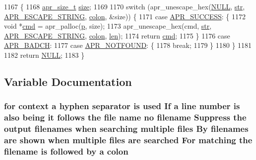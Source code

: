 \begin{DoxyCode}
1167 \{
1168     \hyperlink{group__apr__platform_gaaa72b2253f6f3032cefea5712a27540e}{apr\_size\_t} \hyperlink{group__APACHE__CORE__CONFIG_ga2bd3edb50f631a96f1b729fde236ff43}{size};
1169 
1170     \textcolor{keywordflow}{switch} (apr\_unescape\_hex(\hyperlink{pcre_8txt_ad7f989d16aa8ca809a36bc392c07fba1}{NULL}, \hyperlink{group__MOD__DAV_gaab9226fe8f632e1f998e24276d478f30}{str}, \hyperlink{group__APR__Util__Escaping_ga793ae1b187ce490c65eeee2eb59d2831}{APR\_ESCAPE\_STRING}, 
      \hyperlink{group__APR__Util__Escaping_ga6299e50771f9eb5ee423ea0611f1c896}{colon}, &size)) \{
1171     \textcolor{keywordflow}{case} \hyperlink{group__apr__errno_ga9ee311b7bf1c691dc521d721339ee2a6}{APR\_SUCCESS}: \{
1172         \textcolor{keywordtype}{void} *\hyperlink{group__APACHE__CORE__DAEMON_ga504a7f40c3261db3e10e1d2776642dd6}{cmd} = apr\_palloc(\hyperlink{group__APACHE__CORE__MPM_ga5cd91701e5c167f2b1a38e70ab57817e}{p}, size);
1173         apr\_unescape\_hex(cmd, \hyperlink{group__MOD__DAV_gaab9226fe8f632e1f998e24276d478f30}{str}, \hyperlink{group__APR__Util__Escaping_ga793ae1b187ce490c65eeee2eb59d2831}{APR\_ESCAPE\_STRING}, \hyperlink{group__APR__Util__Escaping_ga6299e50771f9eb5ee423ea0611f1c896}{colon}, 
      \hyperlink{group__APACHE__CORE__LOG_gab5a43233d60ef05c5b5bf5cba3d74468}{len});
1174         \textcolor{keywordflow}{return} \hyperlink{group__APACHE__CORE__DAEMON_ga504a7f40c3261db3e10e1d2776642dd6}{cmd};
1175     \}
1176     \textcolor{keywordflow}{case} \hyperlink{group__APR__Error_ga6f3ca71069880d9fe5678687a257d616}{APR\_BADCH}:
1177     \textcolor{keywordflow}{case} \hyperlink{group__APR__Error_ga9bd83273ff02f31f71fb4dc6f29df4a9}{APR\_NOTFOUND}: \{
1178         \textcolor{keywordflow}{break};
1179     \}
1180     \}
1181 
1182     \textcolor{keywordflow}{return} \hyperlink{pcre_8txt_ad7f989d16aa8ca809a36bc392c07fba1}{NULL};
1183 \}
\end{DoxyCode}


\subsection{Variable Documentation}
\subsubsection[{\texorpdfstring{colon}{colon}}]{\setlength{\rightskip}{0pt plus 5cm}for {\bf context} {\bf a} hyphen {\bf separator} {\bf is} {\bf used} If {\bf a} {\bf line} {\bf number} {\bf is} also being {\bf it} {\bf follows} the {\bf file} {\bf name} no {\bf filename} Suppress the {\bf output} filenames when searching multiple {\bf files} By filenames {\bf are} shown when multiple {\bf files} {\bf are} {\bf searched} For {\bf matching} the {\bf filename} {\bf is} followed by {\bf a} colon}\hypertarget{group__APR__Util__Escaping_ga6299e50771f9eb5ee423ea0611f1c896}{}\label{group__APR__Util__Escaping_ga6299e50771f9eb5ee423ea0611f1c896}
